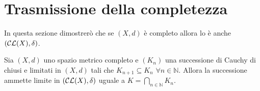 \section{Trasmissione della completezza}



In questa sezione dimostrerò che se $\left (X,d\right )$ è completo allora lo è anche $\left (\mathcal{CL}(X),\delta\right  ) $.


\begin{lemma} \label {inglobati}
Sia $\left (X,d\right )$ uno spazio metrico completo e $\left (K_n \right )$ una successione di Cauchy di chiusi e limitati in $\left (X,d\right )$ tali che $K_{n+1}\subseteq K_n$ $ \forall n \in \mathbb{N}$. Allora la successione ammette limite in $\left (\mathcal{CL} (X),\delta\right  ) $ uguale a $ K=\bigcap_{n \in \mathbb{N}}K_n $.
\end{lemma}

